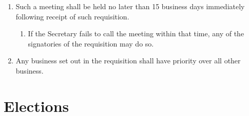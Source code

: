 \documentclass[a4paper]{article}
\begin{document}
\begin{enumerate}
\begin{enumerate}
              \item Such a meeting shall be held no later than 15 business days immediately following receipt of such requisition.
                    \begin{enumerate}
                        \item If the Secretary fails to call the meeting within that time, any of the signatories of the requisition may do so.
                    \end{enumerate}
              \item \label{item:sgm_business_priority} Any business set out in the requisition shall have priority over all other business.
          \end{enumerate}
\end{enumerate}


\section{Elections} \label{sec:elections}
\end{document}
